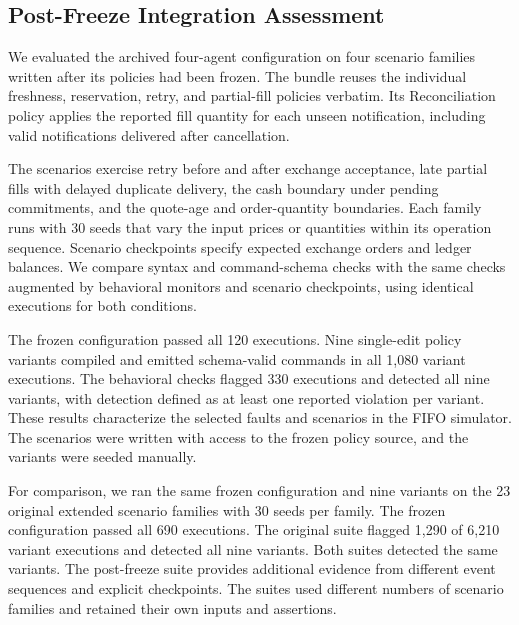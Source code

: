 \subsection{Post-Freeze Integration Assessment}
\label{sec:post-freeze-assessment}

We evaluated the archived four-agent configuration on four scenario
families written after its policies had been frozen. The bundle reuses
the individual freshness, reservation, retry, and partial-fill policies
verbatim. Its Reconciliation policy applies the reported fill quantity
for each unseen notification, including valid notifications delivered
after cancellation.

The scenarios exercise retry before and after exchange acceptance,
late partial fills with delayed duplicate delivery, the cash boundary
under pending commitments, and the quote-age and order-quantity
boundaries. Each family runs with 30 seeds that vary the input prices
or quantities within its operation sequence. Scenario checkpoints
specify expected exchange orders and ledger balances. We compare
syntax and command-schema checks with the same checks augmented by
behavioral monitors and scenario checkpoints, using identical executions
for both conditions.

The frozen configuration passed all 120 executions. Nine single-edit
policy variants compiled and emitted schema-valid commands in all
1,080 variant executions. The behavioral checks flagged 330 executions
and detected all nine variants, with detection defined as at least one
reported violation per variant. These results characterize the
selected faults and scenarios in the FIFO simulator. The scenarios
were written with access to the frozen policy source, and the variants
were seeded manually.

For comparison, we ran the same frozen configuration and nine variants
on the 23 original extended scenario families with 30 seeds per family.
The frozen configuration passed all 690 executions. The original suite
flagged 1,290 of 6,210 variant executions and detected all nine variants.
Both suites detected the same variants. The post-freeze suite provides
additional evidence from different event sequences and explicit checkpoints.
The suites used different numbers of scenario families and retained their
own inputs and assertions.
